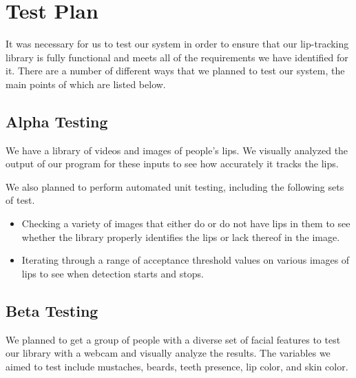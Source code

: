 \chapter{Test Plan}

It was necessary for us to test our system in order to ensure that our lip-tracking library is fully functional and meets all of the requirements we have identified for it. There are a number of different ways that we planned to test our system, the main points of which are listed below.

\section{Alpha Testing}

We have a library of videos and images of people's lips. We visually analyzed the output of our program for these inputs to see how accurately it tracks the lips.

We also planned to perform automated unit testing, including the following sets of test.
\begin{itemize}
	\item Checking a variety of images that either do or do not have lips in them to see whether the library properly identifies the lips or lack thereof in the image.
	\item Iterating through a range of acceptance threshold values on various images of lips to see when detection starts and stops.
\end{itemize}

\section{Beta Testing}

We planned to get a group of people with a diverse set of facial features to test our library with a webcam and visually analyze the results.
The variables we aimed to test include mustaches, beards, teeth presence, lip color, and skin color.